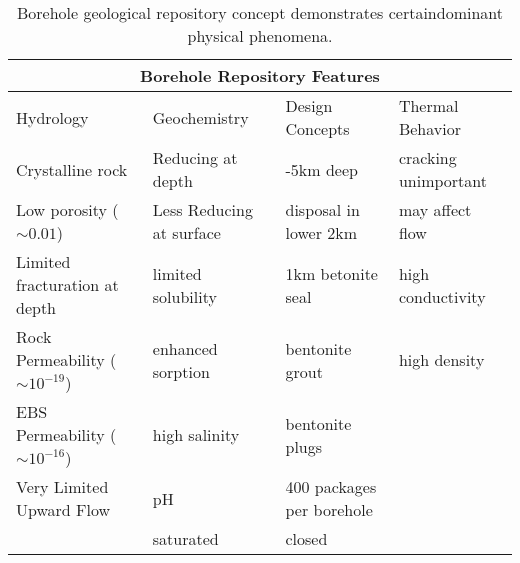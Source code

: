 %
\begin{table}[h!]
  \centering
  \footnotesize{
  \begin{tabular}{|l|l|l|l|}
    \multicolumn{4}{c}{\textbf{Borehole Repository Features}}\\
    \hline
    Hydrology & Geochemistry & Design Concepts & Thermal Behavior \\ 
    \hline
    Crystalline rock&Reducing at depth& -5km deep & cracking unimportant\\
    Low porosity ($\sim 0.01$)&Less Reducing at surface& disposal in lower 2km &may affect flow\\
    Limited fracturation at depth&limited solubility &1km betonite seal & high conductivity\\
    Rock Permeability ($\sim 10^{-19}$) &enhanced sorption &bentonite grout &high density\\
    EBS Permeability ($\sim 10^{-16}$) &high salinity&bentonite plugs&\\
    Very Limited Upward Flow&pH&400 packages per borehole&\\
    &saturated&closed&\\
    \hline
  \end{tabular}
  \caption[Borehole Repository Features]{Borehole geological repository 
  concept demonstrates certaindominant physical phenomena. }
  \label{tab:borehole_tab}
  }
\end{table}
